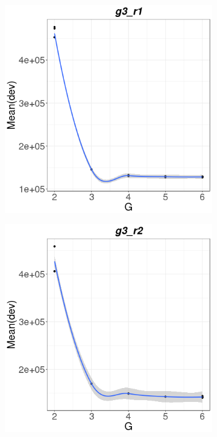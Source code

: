 \documentclass{spbau-diploma}
\begin{document}
\begin{figure}
    \centering
    
   \begin{subfigure}[b]{0.4\textwidth}
        \includegraphics[width=\textwidth]{pics/devs/g3_r1.png}
    \end{subfigure}
    \qquad
    \begin{subfigure}[b]{0.4\textwidth}
        \includegraphics[width=\textwidth]{pics/devs/g3_r2.png}
    \end{subfigure}
      

\end{figure}
\end{document}

